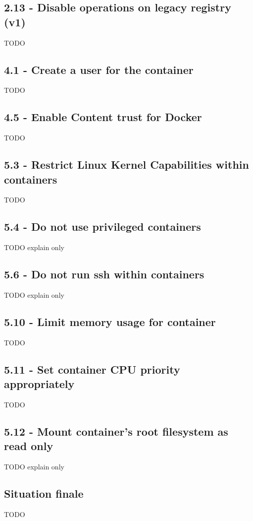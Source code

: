 \documentclass[11pt,a4paper,oneside]{report}
\begin{document}
\subsection{2.13 - Disable operations on legacy registry (v1)}
TODO


\subsection{4.1  - Create a user for the container}
TODO


\subsection{4.5  - Enable Content trust for Docker}
TODO

\subsection{5.3  - Restrict Linux Kernel Capabilities within containers}
TODO

\subsection{5.4  - Do not use privileged containers}
TODO explain only

\subsection{5.6  - Do not run ssh within containers}
TODO explain only

\subsection{5.10 - Limit memory usage for container}
TODO

\subsection{5.11 - Set container CPU priority appropriately}
TODO

\subsection{5.12 - Mount container's root filesystem as read only}
TODO explain only


\subsection{Situation finale}
TODO
\end{document}
